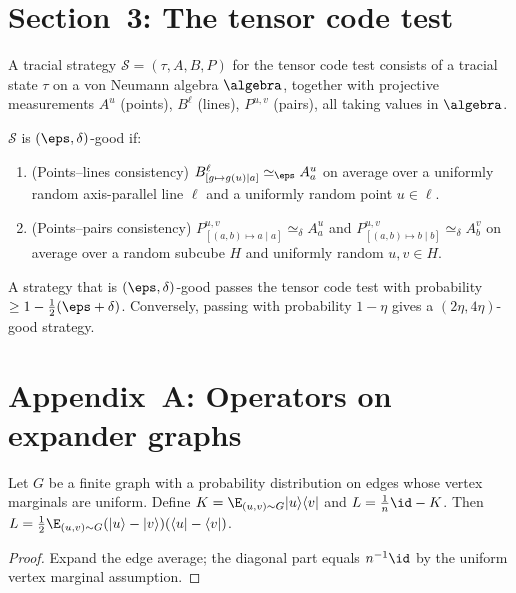 \chapter{Section~3: The tensor code test}
\label{chap:test}

\begin{definition}\label{def:tracial-strat}
  A tracial strategy $\mathcal{S}=(\tau,A,B,P)$ for the tensor code test
  consists of a tracial state $\tau$ on a von Neumann algebra $\algebra$,
  together with projective measurements $A^u$ (points), $B^\ell$ (lines),
  $P^{u,v}$ (pairs), all taking values in $\algebra$.
\end{definition}

\begin{definition}\label{def:tracial-good}
  $\mathcal{S}$ is $(\eps,\delta)$-good if:
  \begin{enumerate}
    \item (Points--lines consistency)
      $B^\ell_{[g\mapsto g(u)\mid a]}\simeq_\eps A^u_a$
      on average over a uniformly random axis-parallel line $\ell$ and
      a uniformly random point $u\in\ell$.
    \item (Points--pairs consistency)
      $P^{u,v}_{[(a,b)\mapsto a\mid a]}\simeq_\delta A^u_a$
      and
      $P^{u,v}_{[(a,b)\mapsto b\mid b]}\simeq_\delta A^v_b$
      on average over a random subcube $H$ and uniformly random $u,v\in H$.
  \end{enumerate}
\end{definition}

\begin{remark}\label{rmk:test-goodness}
  A strategy that is $(\eps,\delta)$-good passes the tensor code test with
  probability $\ge 1-\frac12(\eps+\delta)$.
  Conversely, passing with probability $1-\eta$ gives a
  $(2\eta,4\eta)$-good strategy.
\end{remark}


\chapter{Appendix~A: Operators on expander graphs}
\label{chap:appendix}

\begin{proposition}\label{prop:laplacian-edge-form}
  Let $G$ be a finite graph with a probability distribution on edges
  whose vertex marginals are uniform. Define
  $K=\E_{(u,v)\sim G}|u\rangle\langle v|$ and $L=\frac{1}{n}\id-K$. Then
  $L=\frac12\E_{(u,v)\sim G}(|u\rangle-|v\rangle)(\langle u|-\langle v|)$.
\end{proposition}
\begin{proof}
  Expand the edge average; the diagonal part equals $n^{-1}\id$ by the
  uniform vertex marginal assumption.
\end{proof}

